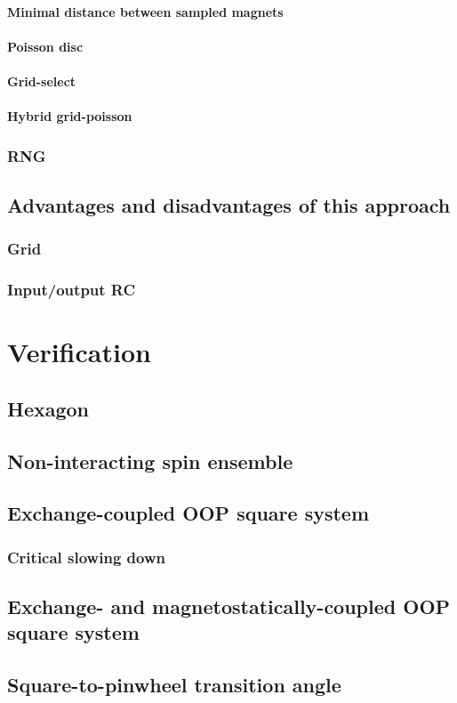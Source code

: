 \paragraph{Minimal distance between sampled magnets} %
\paragraph{Poisson disc}
\paragraph{Grid-select}
\paragraph{Hybrid grid-poisson}
\subsubsection{RNG} %
\subsection{Advantages and disadvantages of this approach} %
\subsubsection{Grid}
\subsubsection{Input/output RC}

\section{Verification} %
\subsection{Hexagon}
\subsection{Non-interacting spin ensemble}
\subsection{Exchange-coupled OOP square system}
\subsubsection{Critical slowing down}
\subsection{Exchange- and magnetostatically-coupled OOP square system}
\subsection{Square-to-pinwheel transition angle}
